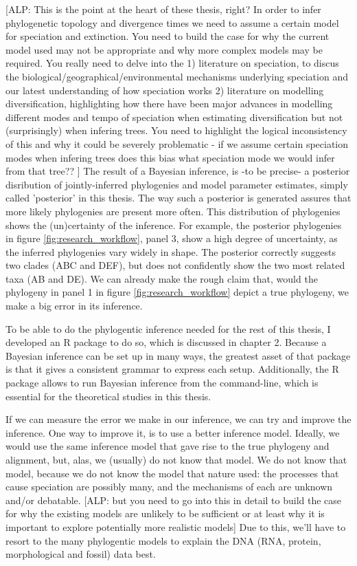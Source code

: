 [ALP: This is the point at the heart of these thesis, right? In order to infer phylogenetic topology and divergence times we need to assume a certain model for speciation and extinction. You need to build the case for why the current model used may not be appropriate and why more complex models may be required. You really need to delve into the 1) literature on speciation, to discus the biological/geographical/environmental mechanisms underlying speciation and our latest understanding of how speciation works 2) literature on modelling diversification, highlighting how there have been major advances in modelling different modes and tempo of speciation when estimating diversification but not (surprisingly) when infering trees. You need to highlight the logical inconsistency of this and why it could be severely problematic - if we assume certain speciation modes when infering trees does this bias what speciation mode we would infer from that tree??  ]
The result of a Bayesian inference, is -to be precise- a posterior
disribution of jointly-inferred phylogenies and model parameter estimates,
simply called 'posterior' in this thesis.
The way such a posterior is generated assures that more likely phylogenies 
are present more often. 
This distribution of phylogenies shows the
(un)certainty of the inference.
For example, the posterior phylogenies in figure \ref{fig:research_workflow},
panel 3, show a high degree of uncertainty, as the
inferred phylogenies vary widely in shape. The posterior correctly
suggests two clades (ABC and DEF), but does not confidently show
the two most related taxa (AB and DE). We can already make 
the rough claim that, would the phylogeny in panel 1 
in figure \ref{fig:research_workflow} depict
a true phylogeny, we make a big error in its inference.

To be able to do the phylogentic inference needed for the rest of this
thesis, I developed an R package to do so, which
is discussed in chapter 2. Because a Bayesian inference can be set up in
many ways, the greatest asset of that package is that it gives a
consistent grammar to express each setup. Additionally, the R package allows
to run Bayesian inference from the command-line, which is essential for
the theoretical studies in this thesis.

If we can measure the error we make in our inference, 
we can try and improve the inference. 
One way to improve it, is to use a better inference model.
Ideally, we would use the same inference model that gave rise to
the true phylogeny and alignment, but, alas, 
we (usually) do not know that model.
We do not know that model, because we do not know the
model that nature used: the
processes that cause speciation are possibly many, and 
the mechanisms of each are unknown and/or debatable.
[ALP: but you need to go into this in detail to build the case for why the existing models are unlikely to be sufficient or at least why it is important to explore potentially more realistic models]
Due to this, we'll have to resort to the many phylogentic models 
to explain the DNA (RNA, protein, morphological and fossil) data best.

